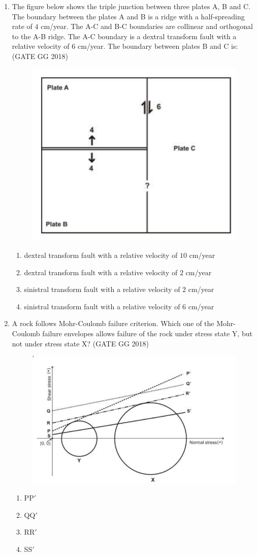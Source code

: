 \documentclass[journal]{IEEEtran}
\begin{document}
\begin{enumerate}[start=1]
\item The figure below shows the triple junction between three plates A, B and C. The boundary between the plates A and B is a ridge with a half-spreading rate of $4$ cm/year. The A-C and B-C boundaries are collinear and orthogonal to the A-B ridge. The A-C boundary is a dextral transform fault with a relative velocity of $6$ cm/year. The boundary between plates B and C is: 
\hfill(GATE GG 2018)
\begin{figure}[H]
        \centering
	\includegraphics[width=0.5\columnwidth]{figs/03.png}
        \caption*{}
        \label{fig:q10}
    \end{figure}
\begin{enumerate}
\item dextral transform fault with a relative velocity of $10$ cm/year
\item dextral transform fault with a relative velocity of $2$ cm/year
\item sinistral transform fault with a relative velocity of $2$ cm/year
\item sinistral transform fault with a relative velocity of $6$ cm/year
\end{enumerate}

\item A rock follows Mohr-Coulomb failure criterion. Which one of the Mohr-Coulomb failure envelopes allows failure of the rock under stress state Y, but not under stress state X?  
\hfill(GATE GG 2018)
\begin{figure}[H]
        \centering
        \includegraphics[width=0.5\columnwidth]{figs/04.png}
        \caption*{}
        \label{fig:q10}
    \end{figure}
\begin{multicols}{4}
\begin{enumerate}
\item PP$'$
\item QQ$'$
\item RR$'$
\item SS$'$
\end{enumerate}
\end{multicols}


\end{enumerate}
\end{document}
